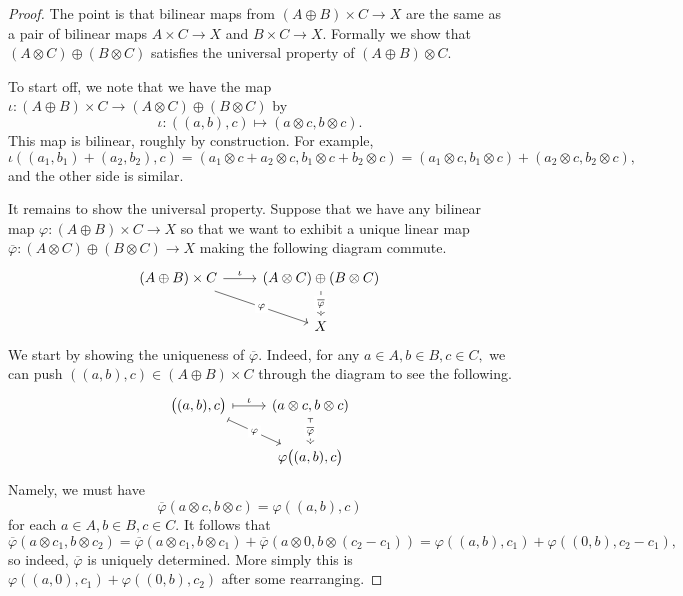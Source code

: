 \documentclass[../notes.tex]{subfiles}
\begin{document}
\begin{proof}
	The point is that bilinear maps from $(A\oplus B)\times C\to X$ are the same as a pair of bilinear maps $A\times C\to X$ and $B\times C\to X.$ Formally we show that $(A\otimes C)\oplus(B\otimes C)$ satisfies the universal property of $(A\oplus B)\otimes C.$

	To start off, we note that we have the map $\iota:(A\oplus B)\times C\to(A\otimes C)\oplus(B\otimes C)$ by
	\[\iota:((a,b),c)\mapsto(a\otimes c,b\otimes c).\]
	This map is bilinear, roughly by construction. For example,
	\[\iota((a_1,b_1)+(a_2,b_2),c)=(a_1\otimes c+a_2\otimes c,b_1\otimes c+b_2\otimes c)=(a_1\otimes c,b_1\otimes c)+(a_2\otimes c,b_2\otimes c),\]
	and the other side is similar.

	It remains to show the universal property. Suppose that we have any bilinear map $\varphi:(A\oplus B)\times C\to X$ so that we want to exhibit a unique linear map $\overline\varphi:(A\otimes C)\oplus(B\otimes C)\to X$ making the following diagram commute.
	\[\begin{tikzcd}
		{(A\oplus B)\times C} & {(A\otimes C)\oplus(B\otimes C)} \\
		& X
		\arrow["\iota", from=1-1, to=1-2]
		\arrow["\varphi"{description}, from=1-1, to=2-2]
		\arrow["\overline\varphi"{description}, dashed, from=1-2, to=2-2]
	\end{tikzcd}\]
	We start by showing the uniqueness of $\overline\varphi.$ Indeed, for any $a\in A,b\in B,c\in C,$ we can push $((a,b),c)\in(A\oplus B)\times C$ through the diagram to see the following.
	\[\begin{tikzcd}
		{\big((a,b),c\big)} & {(a\otimes c,b\otimes c)} \\
		& {\varphi\big((a,b),c\big)}
		\arrow["\iota", maps to, from=1-1, to=1-2]
		\arrow["\varphi"{description}, maps to, from=1-1, to=2-2]
		\arrow["\overline\varphi"{description}, dashed, maps to, from=1-2, to=2-2]
	\end{tikzcd}\]
	Namely, we must have
	\[\overline\varphi(a\otimes c,b\otimes c)=\varphi((a,b),c)\]
	for each $a\in A,b\in B,c\in C.$ It follows that
	\[\overline\varphi(a\otimes c_1,b\otimes c_2)=\overline\varphi(a\otimes c_1,b\otimes c_1)+\overline\varphi(a\otimes0,b\otimes(c_2-c_1))=\varphi((a,b),c_1)+\varphi((0,b),c_2-c_1),\]
	so indeed, $\overline\varphi$ is uniquely determined. More simply this is $\varphi((a,0),c_1)+\varphi((0,b),c_2)$ after some rearranging.
	

\end{proof}
\end{document}
